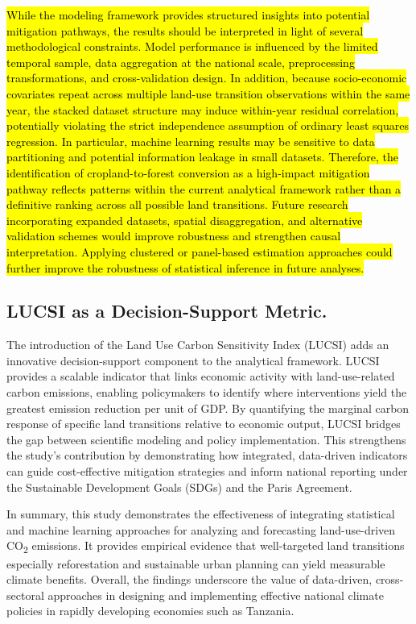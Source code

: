\documentclass[10pt,letterpaper]{article}
\begin{document}
\hl{While the modeling framework provides structured insights into potential mitigation pathways, the results should be interpreted in light of several methodological constraints. Model performance is influenced by the limited temporal sample, data aggregation at the national scale, preprocessing transformations, and cross-validation design. In addition, because socio-economic covariates repeat across multiple land-use transition observations within the same year, the stacked dataset structure may induce within-year residual correlation, potentially violating the strict independence assumption of ordinary least squares regression. In particular, machine learning results may be sensitive to data partitioning and potential information leakage in small datasets. Therefore, the identification of cropland-to-forest conversion as a high-impact mitigation pathway reflects patterns within the current analytical framework rather than a definitive ranking across all possible land transitions. Future research incorporating expanded datasets, spatial disaggregation, and alternative validation schemes would improve robustness and strengthen causal interpretation. Applying clustered or panel-based estimation approaches could further improve the robustness of statistical inference in future analyses.}






\subsection{LUCSI as a Decision-Support Metric.}
The introduction of the Land Use Carbon Sensitivity Index (LUCSI) adds an innovative decision-support component to the analytical framework. LUCSI provides a scalable indicator that links economic activity with land-use-related carbon emissions, enabling policymakers to identify where interventions yield the greatest emission reduction per unit of GDP. By quantifying the marginal carbon response of specific land transitions relative to economic output, LUCSI bridges the gap between scientific modeling and policy implementation. This strengthens the study’s contribution by demonstrating how integrated, data-driven indicators can guide cost-effective mitigation strategies and inform national reporting under the Sustainable Development Goals (SDGs) and the Paris Agreement.

In summary, this study demonstrates the effectiveness of integrating statistical and machine learning approaches for analyzing and forecasting land-use-driven CO\textsubscript{2} emissions. It provides empirical evidence that well-targeted land transitions especially reforestation and sustainable urban planning can yield measurable climate benefits. Overall, the findings underscore the value of data-driven, cross-sectoral approaches in designing and implementing effective national climate policies in rapidly developing economies such as Tanzania.
\end{document}
